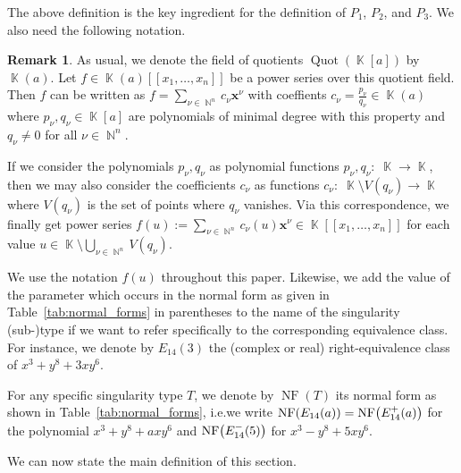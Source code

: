 \documentclass{amsproc}
\theoremstyle{definition}
\newtheorem{remark}[theorem]{Remark}
\let\originalleft\left
\let\originalright\right
\renewcommand{\left}{\mathopen{}\mathclose\bgroup\originalleft}
\renewcommand{\right}{\aftergroup\egroup\originalright}
\DeclareMathOperator{\N}{\mathbb{N}}
\DeclareMathOperator{\K}{\mathbb{K}}
\DeclareMathOperator{\NF}{NF}
\DeclareMathOperator{\Quot}{Quot}
\begin{document}
The above definition is the key ingredient for the definition of $P_1$, $P_2$,
and $P_3$. We also need the following notation.

\begin{remark}
As usual, we denote the field of quotients $\Quot(\K[a])$ by $\K(a)$. Let
$f \in \K(a)[[x_1,\ldots,x_n]]$ be a power series over this quotient field.
Then $f$ can be written as $f = \sum_{\nu \in \N^n} c_\nu \boldsymbol{x}^\nu$
with coeffients $c_\nu = \frac{p_\nu}{q_\nu} \in \K(a)$ where
$p_\nu, q_\nu \in \K[a]$ are polynomials of minimal degree with this property
and $q_\nu \neq 0$ for all $\nu \in \N^n$.

If we consider the polynomials $p_\nu, q_\nu$ as polynomial functions
$p_\nu, q_\nu: \; \K \rightarrow \K$, then we may also consider the
coefficients $c_\nu$ as functions
$c_\nu: \; \K \setminus V(q_\nu) \rightarrow \K$ where $V(q_\nu)$ is the set of
points where $q_\nu$ vanishes. Via this correspondence, we finally get power
series
$f(u) := \sum_{\nu \in \N^n} c_\nu(u) \boldsymbol{x}^\nu
\in \K[[x_1,\ldots,x_n]]$ for each value
$u \in \K \setminus \bigcup_{\nu \in \N^n} V(q_\nu)$.
\end{remark}

We use the notation $f(u)$ throughout this paper. Likewise, we add the
value of the parameter which occurs in the normal form as given in
Table~\ref{tab:normal_forms} in parentheses to the name of the singularity
(sub-)type if we want to refer specifically to the corresponding equivalence
class. For instance, we denote by $E_{14}(3)$ the (complex or real)
right-equivalence class of $x^3+y^8+3xy^6$.

For any specific singularity type $T$, we denote by $\NF(T)$ its normal form as
shown in Table~\ref{tab:normal_forms}, i.e.\@ we write
$\NF\left(E_{14}(a)\right) = \NF\left(E_{14}^+(a)\right)$ for the polynomial
$x^3+y^8+axy^6$ and $\NF\left(E_{14}^-(5)\right)$ for $x^3-y^8+5xy^6$.

We can now state the main definition of this section.
\end{document}
